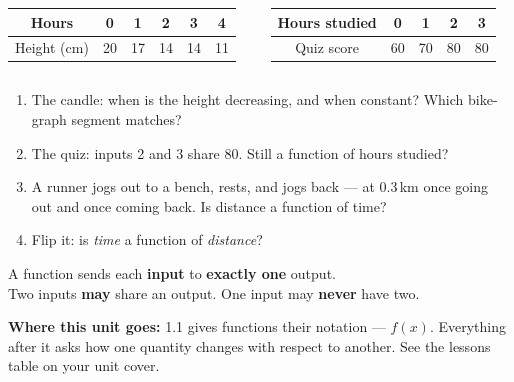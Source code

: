 \documentclass[aspectratio=169, 11pt]{beamer}
\begin{document}
\begin{frame}[t, plain]

  \begin{columns}[T]
      \begin{tabular}{|c|c|c|c|c|c|}
      \hline Hours & 0 & 1 & 2 & 3 & 4 \\ \hline Height (cm) & 20 & 17 & 14 & 14 & 11 \\ \hline
      \end{tabular}
      \begin{tabular}{|c|c|c|c|c|}
      \hline Hours studied & 0 & 1 & 2 & 3 \\ \hline Quiz score & 60 & 70 & 80 & 80 \\ \hline
      \end{tabular}
  \end{columns}

  \medskip
  \begin{enumerate}\setlength{\itemsep}{6pt}
    \setcounter{enumi}{15}
    \item The candle: when is the height decreasing, and when constant? Which bike-graph
          segment matches?
    \item The quiz: inputs 2 and 3 share 80. Still a function of hours studied?
    \item A runner jogs out to a bench, rests, and jogs back --- at 0.3\,km once going out
          and once coming back. Is distance a function of time?
    \item Flip it: is \textit{time} a function of \textit{distance}?
  \end{enumerate}
\end{frame}

\begin{frame}[t, plain]

  \bigskip
  \begin{block}{A function}
    sends each \textbf{input} to \textbf{exactly one} output.\\[4pt]
    Two inputs \textbf{may} share an output. One input may \textbf{never} have two.
  \end{block}

  \bigskip
  \textbf{Where this unit goes:} 1.1 gives functions their notation --- \(f(x)\).
  Everything after it asks how one quantity changes with respect to another. See the
  lessons table on your unit cover.
\end{frame}
\end{document}
